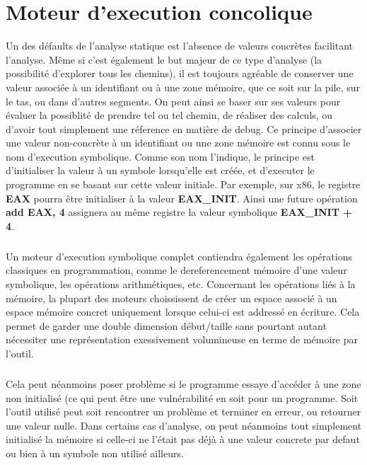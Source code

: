 \section{Moteur d'execution concolique}
Un des défaults de l'analyse statique est l'absence de valeurs concrètes facilitant l'analyse. Même si c'est également
le but majeur de ce type d'analyse (la possibilité d'explorer tous les chemins), il est toujours agréable de conserver une valeur
associée à un identifiant ou à une zone mémoire, que ce soit sur la pile, sur le tas, ou dans d'autres segments. On peut ainsi se baser
sur ses valeurs pour évaluer la possiblité de prendre tel ou tel chemin, de réaliser des calculs, ou d'avoir tout simplement une réference en
matière de debug.
Ce principe d'associer une valeur non-concrète à un identifiant ou une zone mémoire est connu sous le nom d'execution symbolique. Comme son nom
l'indique, le principe est d'initialiser la valeur à un symbole lorsqu'elle est créée, et d'executer le programme en se basant sur cette valeur initiale.
Par exemple, sur x86, le registre \textbf{EAX} pourra être initialiser à la valeur \textbf{EAX\_INIT}. Ainsi une future opération \textbf{add EAX, 4} assignera
au même registre la valeur symbolique \textbf{EAX\_INIT + 4}.

\subparagraph{}
Un moteur d'execution symbolique complet contiendra également les opérations classiques en programmation, comme le dereferencement mémoire d'une valeur
symbolique, les opérations arithmétiques, etc. Concernant les opérations liés à la mémoire, la plupart des moteurs choississent de créer un espace associé à
un espace mémoire concret uniquement lorsque celui-ci est addressé en écriture. Cela permet de garder une double dimension début/taille sans pourtant autant
nécessiter une représentation exessivement volumineuse en terme de mémoire par l'outil.
\subparagraph{}
Cela peut néanmoins poser problème si le programme essaye d'accéder à une
zone non initialisé (ce qui peut être une vulnérabilité en soit pour un programme. Soit l'outil utilisé peut soit rencontrer un problème et terminer en erreur,
ou retourner une valeur nulle. Dans certains cas d'analyse, on peut néanmoins tout simplement initialisé la mémoire si celle-ci ne l'était pas déjà à une valeur concrete
par defaut ou bien à un symbole non utilisé ailleurs.

